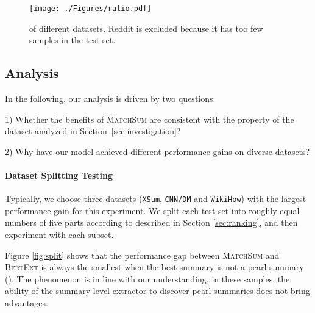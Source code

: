 \documentclass[11pt,a4paper]{article}
\begin{document}
\begin{figure*}[t]
  \centering
 \caption{Datasets splitting experiment. We split test sets into five parts according to  described in Section \ref{sec:ranking}. The X-axis from left to right indicates the subsets of the test set with the value of  from small to large, and the Y-axis represents the ROUGE improvement of \textsc{MatchSum} over \textsc{BertExt} on this subset.}
 \label{fig:split}
\end{figure*}


\begin{figure}
    \centering
    \texttt{[image: ./Figures/ratio.pdf]}
    \caption{ of different datasets. Reddit is excluded because it has too few samples in the test set.}
    \label{fig:ratio}
\end{figure}



\subsection{Analysis}
\label{sec:Analyzing}
In the following, our analysis is driven by two questions:

1) Whether the benefits of \textsc{MatchSum} are consistent with the property of the dataset analyzed in Section~\ref{sec:investigation}?

2) Why have our model achieved different performance gains on diverse datasets?



\paragraph{Dataset Splitting Testing} Typically, we choose three datasets (\texttt{XSum}, \texttt{CNN/DM} and \texttt{WikiHow}) with the largest performance gain for this experiment. We split each test set into roughly equal numbers of five parts according to  described in Section \ref{sec:ranking}, and then experiment with each subset.

Figure \ref{fig:split} shows that the performance gap between \textsc{MatchSum} and \textsc{BertExt} is always the smallest when the best-summary is not a pearl-summary (). The phenomenon is in line with our understanding, in these samples, the ability of the summary-level extractor to discover pearl-summaries does not bring advantages.
\end{document}
